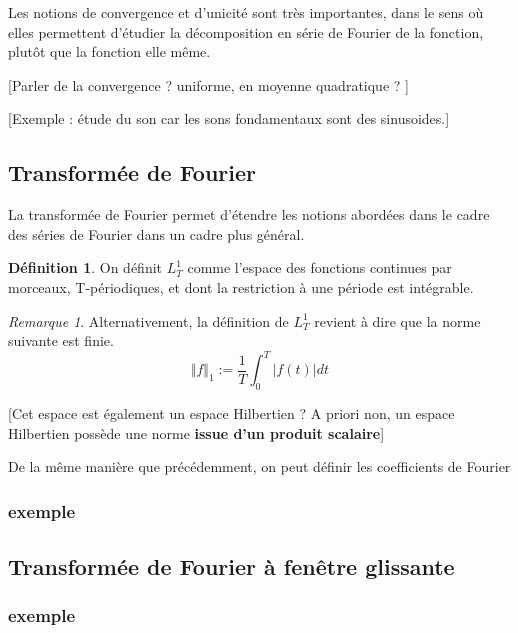 \documentclass[]{article}
\theoremstyle{remark}
\newtheorem{myrem}{Remarque}
\theoremstyle{definition}
\newtheorem{mydef}{Définition}
\begin{document}
			Les notions de convergence et d'unicité sont très importantes, dans le sens où elles permettent d'étudier la décomposition en série de Fourier de la fonction, plutôt que la fonction elle même. 

			[Parler de la convergence ? uniforme, en moyenne quadratique ? ]
			
			
			[Exemple : étude du son car les sons fondamentaux sont des sinusoides.] 
			
			
			
			\subsection{Transformée de Fourier}
			La transformée de Fourier permet d'étendre les notions abordées dans le cadre des séries de Fourier dans un cadre plus général. 
			
			\begin{mydef}
				On définit $L^1_T$ comme l'espace des fonctions continues par morceaux, T-périodiques, et dont la restriction à une période est intégrable. 
			\end{mydef}
			
			
			\begin{myrem}
				Alternativement, la définition de $L^1_T$ revient à dire que la norme suivante est finie. $$\Vert f\Vert_1 := \frac{1}{T}\int_{0}^{T} \vert f(t)\vert dt $$
			\end{myrem}
			
			[Cet espace est également un espace Hilbertien ? A priori non, un espace Hilbertien possède une norme \textbf{issue d'un produit scalaire}]
			
			De la même manière que précédemment, on peut définir les coefficients de Fourier
			
			
			
					
	
	
	
	\subsubsection{exemple}
	
	
	\subsection{Transformée de Fourier à fenêtre glissante}
	\subsubsection{exemple}
	
\end{document}
